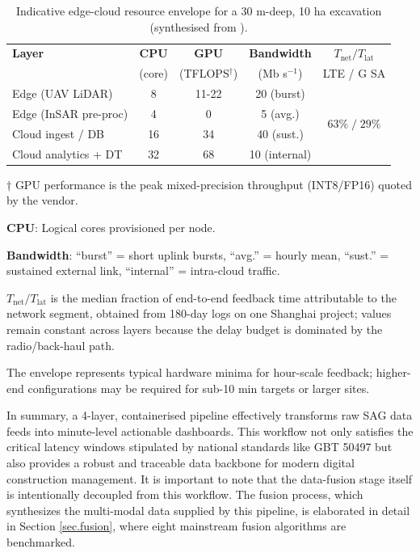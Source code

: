 \documentclass[preprint,11pt,authoryear,3p]{elsarticle}
\begin{document}
\begin{table}[htbp]
\centering\small
\begin{threeparttable}
\caption{Indicative edge-cloud resource envelope for a 30 m-deep,
10 ha excavation (synthesised from \citep{IoTSurvey,Elbamby2019,Fadhil2022}).}
\label{tab:resource}
\begin{tabular}{@{}lcccc@{}}
\toprule
\textbf{Layer} & \textbf{CPU} & \textbf{GPU} & \textbf{Bandwidth} &
\(T_{\text{net}}/T_{\text{lat}}\) \\[-2pt]
               & (core) & (TFLOPS$^{\dagger}$) & (Mb s\(^{-1}\)) & LTE \;/\;5 G SA \\ \midrule
Edge (UAV LiDAR)        & 8  & 11-22 & 20 (burst)      & \multirow{4}{*}{\(63\%\;/\;29\%\)} \\
Edge (InSAR pre-proc)   & 4  & 0     & 5 (avg.)        &  \\
Cloud ingest / DB       & 16 & 34    & 40 (sust.)      &  \\
Cloud analytics + DT    & 32 & 68    & 10 (internal)   &  \\ \bottomrule
\end{tabular}
\begin{tablenotes}\footnotesize
\item[$\dagger$] GPU performance is the peak mixed-precision throughput (INT8/FP16) quoted by the vendor.
\item \textbf{CPU}: Logical cores provisioned per node.  
\item \textbf{Bandwidth}: “burst” = short uplink bursts, “avg.” = hourly mean, “sust.” = sustained external link, “internal” = intra-cloud traffic.  
\item \(T_{\text{net}}/T_{\text{lat}}\) is the median fraction of end-to-end feedback time attributable to the network segment, obtained from 180-day logs on one Shanghai project; values remain constant across layers because the delay budget is dominated by the radio/back-haul path.  
\item The envelope represents typical hardware minima for hour-scale feedback; higher-end configurations may be required for sub-10 min targets or larger sites.
\end{tablenotes}
\end{threeparttable}
\end{table}

In summary, a 4-layer, containerised pipeline effectively transforms raw SAG data feeds into minute-level actionable dashboards. This workflow not only satisfies the critical latency windows stipulated by national standards like GBT 50497 but also provides a robust and traceable data backbone for modern digital construction management. It is important to note that the data-fusion stage itself is intentionally decoupled from this workflow. The fusion process, which synthesizes the multi-modal data supplied by this pipeline, is elaborated in detail in Section \ref{sec.fusion}, where eight mainstream fusion algorithms are benchmarked.
\end{document}
